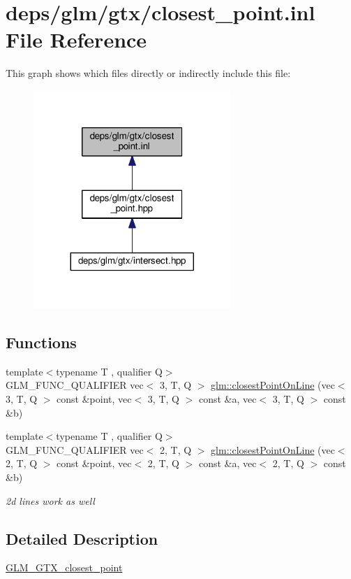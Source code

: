 \hypertarget{closest__point_8inl}{}\section{deps/glm/gtx/closest\+\_\+point.inl File Reference}
\label{closest__point_8inl}
This graph shows which files directly or indirectly include this file\+:
\nopagebreak
\begin{figure}[H]
\begin{center}
\leavevmode
\includegraphics[width=212pt]{d8/d97/closest__point_8inl__dep__incl}
\end{center}
\end{figure}
\subsection*{Functions}
\begin{DoxyCompactItemize}
\item 
{\footnotesize template$<$typename T , qualifier Q$>$ }\\G\+L\+M\+\_\+\+F\+U\+N\+C\+\_\+\+Q\+U\+A\+L\+I\+F\+I\+ER vec$<$ 3, T, Q $>$ \hyperlink{group__gtx__closest__point_ga36529c278ef716986151d58d151d697d}{glm\+::closest\+Point\+On\+Line} (vec$<$ 3, T, Q $>$ const \&point, vec$<$ 3, T, Q $>$ const \&a, vec$<$ 3, T, Q $>$ const \&b)
\item 
{\footnotesize template$<$typename T , qualifier Q$>$ }\\G\+L\+M\+\_\+\+F\+U\+N\+C\+\_\+\+Q\+U\+A\+L\+I\+F\+I\+ER vec$<$ 2, T, Q $>$ \hyperlink{group__gtx__closest__point_ga55bcbcc5fc06cb7ff7bc7a6e0e155eb0}{glm\+::closest\+Point\+On\+Line} (vec$<$ 2, T, Q $>$ const \&point, vec$<$ 2, T, Q $>$ const \&a, vec$<$ 2, T, Q $>$ const \&b)
\begin{DoxyCompactList}\small\item\em 2d lines work as well \end{DoxyCompactList}\end{DoxyCompactItemize}


\subsection{Detailed Description}
\hyperlink{group__gtx__closest__point}{G\+L\+M\+\_\+\+G\+T\+X\+\_\+closest\+\_\+point} 